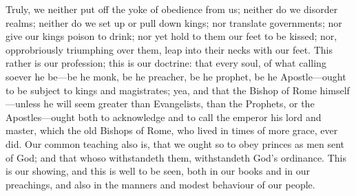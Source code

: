 Truly, we neither put off the yoke of obedience from us; neither
do we disorder realms; neither do we set up or pull down kings; nor
translate governments; nor give our kings poison to drink; nor yet hold
to them our feet to be kissed; nor, opprobriously triumphing over them,
leap into their necks with our feet. This rather is our profession;
this is our doctrine: that every soul, of what calling soever he be—be
he monk, be he preacher, be he prophet, be he Apostle—ought to
be subject to kings and magistrates; yea, and that the Bishop of Rome
himself—unless he will seem greater than Evangelists, than the
Prophets, or the Apostles—ought both to acknowledge and to call
the emperor his lord and master, which the old Bishops of Rome, who
lived in times of more grace, ever did. Our common teaching also
is, that we ought so to obey princes as men sent of God; and that whoso
withstandeth them, withstandeth God’s ordinance. This is
our showing, and this is well to be seen, both in our books and in our
preachings, and also in the manners and modest behaviour of our people.

